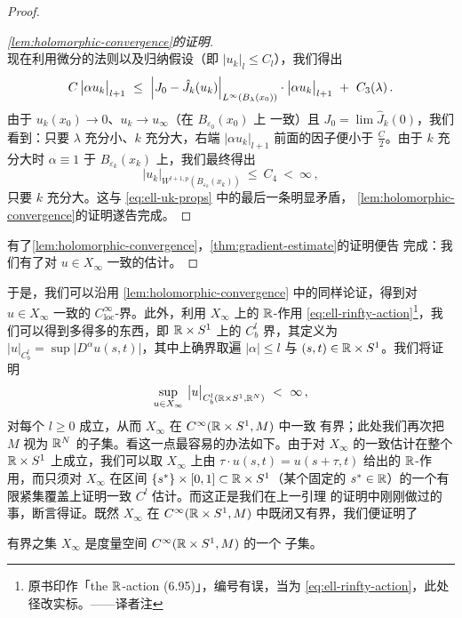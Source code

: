 \begin{proof}
\begin{proof}[\cref*{lem:holomorphic-convergence}的证明]
\[\]
现在利用微分的\trLeibniz{}法则以及归纳假设（即%
$\bigl|u_{k}\bigr|_{l}\leq C_{l}$），我们得出
\[
C\,\bigl|\alpha u_{k}\bigr|_{l+1}\ \leq\ \Bigl|J_{0}-\hat{J}_{k}(u_{k})\Bigr|_{L^{\infty}\left(B_{\lambda}(x_{0})\right)}\cdot\bigl|\alpha u_{k}\bigr|_{l+1}\ +\ C_{3}(\lambda)\,.
\]
由于 $u_{k}(x_{0})\to0$、$u_{k}\to u_{\infty}$（在 $B_{\varepsilon_{0}}(x_{0})$ 上%
一致）且 $J_{0}=\lim\hat{J}_{k}(0)$，我们看到：只要 $\lambda$ 充分小、$k$ 充分大，右端%
$|\alpha u_{k}|_{l+1}$ 前面的因子便小于 $\frac{C}{2}$。由于 $k$ 充分大时%
$\alpha\equiv1$ 于 $B_{\varepsilon_{k}}(x_{k})$ 上，我们最终得出
\[
\bigl|u_{k}\bigr|_{W^{l+1,p}\left(B_{\varepsilon_{k}}(x_{k})\right)}\ \leq\ C_{4}\ <\ \infty\,,
\]
只要 $k$ 充分大。这与 \eqref{eq:ell-uk-props} 中的最后一条明显矛盾，%
\cref{lem:holomorphic-convergence}的证明遂告完成。
\end{proof}

有了\cref{lem:holomorphic-convergence}，\cref{thm:gradient-estimate}的证明便告%
完成：我们有了对 $u\in X_{\infty}$ 一致的\trGradient{}估计。
\end{proof}
于是，我们可以沿用%
\cref{lem:holomorphic-convergence} 中的同样论证，得到对 $u\in X_{\infty}$ 一致的%
$C^{\infty}_{\mathrm{loc}}$-界。此外，利用 $X_{\infty}$ 上的 $\mathbb{R}$-作用%
\eqref{eq:ell-rinfty-action}\footnote{原书印作「the $\mathbb{R}$-action (6.95)」，编号有误，当为 \eqref{eq:ell-rinfty-action}，此处径改实标。——译者注}，我们可以得到多得多的东西，即 $\mathbb{R}\times S^{1}$ 上的%
$C^{l}_{b}$ 界，其\trNorm{}定义为%
$\bigl|u\bigr|_{C^{l}_{b}}=\sup\bigl|D^{\alpha}u(s,t)\bigr|$，其中上确界取遍%
$|\alpha|\leq l$ 与 $(s,t)\in\mathbb{R}\times S^{1}$。我们将证明
\[
\sup_{u\in X_{\infty}}\ \bigl|u\bigr|_{C^{l}_{b}\left(\R\times S^{1},\R^{N}\right)}\ <\ \infty\,,
\]
对每个 $l\geq0$ 成立，从而 $X_{\infty}$ 在 $C^{\infty}(\mathbb{R}\times S^{1},M)$ 中一致%
有界；此处我们再次把 $M$ 视为 $\mathbb{R}^{N}$ 的子集。看这一点最容易的办法如下。由于对%
$X_{\infty}$ 的一致\trGradient{}估计在整个 $\mathbb{R}\times S^{1}$ 上成立，我们可以取%
$X_{\infty}$ 上由 $\tau\cdot u(s,t)=u(s+\tau,t)$ 给出的 $\mathbb{R}$-作用，而只须对%
$X_{\infty}$ 在区间 $\{s^{*}\}\times[0,1]\subset\mathbb{R}\times S^{1}$（某个固定的%
$s^{*}\in\mathbb{R}$）的一个有限紧集覆盖上证明一致 $C^{l}$ 估计。而这正是我们在上一引理%
的证明中刚刚做过的事，断言得证。既然 $X_{\infty}$ 在%
$C^{\infty}(\mathbb{R}\times S^{1},M)$ 中既闭又有界，我们便证明了

\begin{proposition}\label{prop:xinfty-compact}
有界\trOrbit{}之集 $X_{\infty}$ 是度量空间 $C^{\infty}(\mathbb{R}\times S^{1},M)$ 的一个%
\trCompact{}子集。
\end{proposition}

